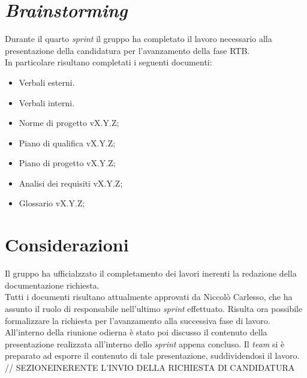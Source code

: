 \section{\textit{Brainstorming}}
Durante il quarto \textit{sprint} il gruppo ha completato il lavoro necessario alla presentazione della candidatura per l'avanzamento della fase RTB.\\
In particolare risultano completati i seguenti documenti:
\begin{itemize}
    \item Verbali esterni.
    \item Verbali interni.
    \item Norme di progetto vX.Y.Z;
    \item Piano di qualifica vX.Y.Z;
    \item Piano di progetto vX.Y.Z;
    \item Analisi dei requisiti vX.Y.Z;
    \item Glossario vX.Y.Z;
\end{itemize}

\section{Considerazioni}
Il gruppo ha ufficialzzato il completamento dei lavori inerenti la redazione della documentazione richiesta.\\
Tutti i documenti risultano attualmente approvati da Niccolò Carlesso, che ha assunto il ruolo di responsabile nell'ultimo \textit{sprint} effettuato.
Risulta ora possibile formalizzare la richiesta per l'avanzamento alla successiva fase di lavoro.\\
All'interno della riunione odierna è stato poi discusso il contenuto della presentazione realizzata all'interno dello \textit{sprint} appena concluso.
Il \textit{team} si è preparato ad esporre il contenuto di tale presentazione, suddividendosi il lavoro.\\


// SEZIONEINERENTE L'INVIO DELLA RICHIESTA DI CANDIDATURA